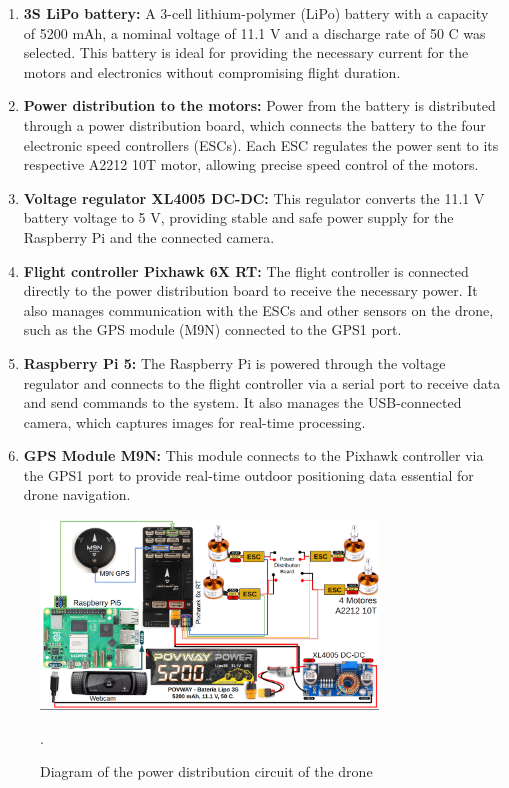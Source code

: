     \begin{enumerate}
        \item \textbf{3S LiPo battery:} 
        A 3-cell lithium-polymer (LiPo) battery with a capacity of 5200 mAh, a nominal voltage of 11.1 V and a discharge rate of 50 C was selected. This battery is ideal for providing the necessary current for the motors and electronics without compromising flight duration.

        \item \textbf{Power distribution to the motors:} 
        Power from the battery is distributed through a power distribution board, which connects the battery to the four electronic speed controllers (ESCs). Each ESC regulates the power sent to its respective A2212 10T motor, allowing precise speed control of the motors.
    
        \item \textbf{Voltage regulator XL4005 DC-DC:} 
        This regulator converts the 11.1 V battery voltage to 5 V, providing stable and safe power supply for the Raspberry Pi and the connected camera.
    
        \item \textbf{Flight controller Pixhawk 6X RT:} 
        The flight controller is connected directly to the power distribution board to receive the necessary power. It also manages communication with the ESCs and other sensors on the drone, such as the GPS module (M9N) connected to the GPS1 port.

        \item \textbf{Raspberry Pi 5:} 
        The Raspberry Pi is powered through the voltage regulator and connects to the flight controller via a serial port to receive data and send commands to the system. It also manages the USB-connected camera, which captures images for real-time processing.
    
        \item \textbf{GPS Module M9N:} 
        This module connects to the Pixhawk controller via the GPS1 port to provide real-time outdoor positioning data essential for drone navigation.
    
    \end{enumerate}
    
    \begin{center}
        \begin{figure}[h!]
            \centering
            \includegraphics[width=0.8\textwidth]{pictures/drone_electronic_diagram.png}
            \caption{Diagram of the power distribution circuit of the drone}.
        \end{figure}
    \end{center}
        

